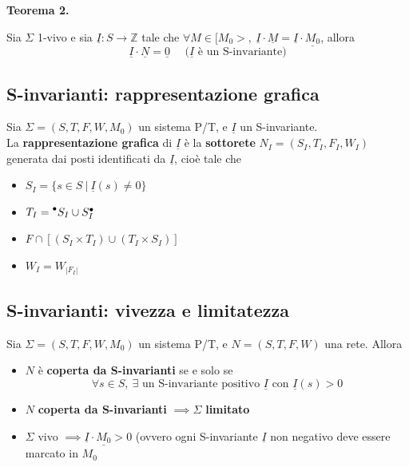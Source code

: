 \textbf{Teorema 2.}

Sia $\Sigma$ 1-vivo e sia $\underline I : S \to \mathbb Z$ tale che $\forall M \in [M_0>, \ \underline I \cdot \underline M = \underline I \cdot \underline{M_0}$, allora
\[
    \underline I \cdot \underline N = \underline 0 \quad \text{ ($\underline I$ è un S-invariante)}    
\]

\subsection{S-invarianti: rappresentazione grafica}

Sia $\Sigma = (S, T, F, W, M_0)$ un sistema P/T, e $\underline I$ un S-invariante.\\
La \textbf{rappresentazione grafica} di $\underline I$ è la \textbf{sottorete} $N_I = (S_I, T_I, F_I, W_I)$ generata dai posti identificati da $\underline I$, cioè tale che
\begin{itemize}
    \item $S_I = \{ s \in S \ | \ \underline I(s) \neq 0 \}$
    \item $T_I = \prescript{\bullet}{}{S_I} \cup S_I^\bullet$
    \item $F \cap [(S_I \times T_I)\cup(T_I\times S_I)]$
    \item $W_I = W_{|F_I|}$
\end{itemize}

\subsection{S-invarianti: vivezza e limitatezza}

Sia $\Sigma = (S, T, F, W, M_0)$ un sistema P/T, e $N=(S, T, F, W)$ una rete. Allora
\begin{itemize}
    \item $N$ è \textbf{coperta da S-invarianti} se e solo se 
        \[
            \forall s \in S, \ \exists \text{ un S-invariante positivo $\underline I$ con } \underline I(s) > 0
        \]
    \item $N$ \textbf{coperta da S-invarianti} $\implies \Sigma$ \textbf{limitato}
    \item $\Sigma$ vivo $\implies \underline I \cdot \underline{M_0} > 0$ (ovvero ogni S-invariante $\underline I$ non negativo deve essere marcato in $M_0$
\end{itemize}
